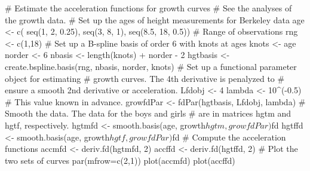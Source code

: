 \begin{Examples}
\begin{ExampleCode}

#  Estimate the acceleration functions for growth curves
#  See the analyses of the growth data.
#  Set up the ages of height measurements for Berkeley data
age <- c( seq(1, 2, 0.25), seq(3, 8, 1), seq(8.5, 18, 0.5))
#  Range of observations
rng <- c(1,18)
#  Set up a B-spline basis of order 6 with knots at ages
knots  <- age
norder <- 6
nbasis <- length(knots) + norder - 2
hgtbasis <- create.bspline.basis(rng, nbasis, norder, knots)
#  Set up a functional parameter object for estimating
#  growth curves.  The 4th derivative is penalyzed to
#  ensure a smooth 2nd derivative or acceleration.
Lfdobj <- 4
lambda <- 10^(-0.5)   #  This value known in advance.
growfdPar <- fdPar(hgtbasis, Lfdobj, lambda)
#  Smooth the data.  The data for the boys and girls
#  are in matrices hgtm and hgtf, respectively.
hgtmfd <- smooth.basis(age, growth$hgtm, growfdPar)$fd
hgtffd <- smooth.basis(age, growth$hgtf, growfdPar)$fd
#  Compute the acceleration functions
accmfd <- deriv.fd(hgtmfd, 2)
accffd <- deriv.fd(hgtffd, 2)
#  Plot the two sets of curves
par(mfrow=c(2,1))
plot(accmfd)
plot(accffd)

\end{ExampleCode}
\end{Examples}

